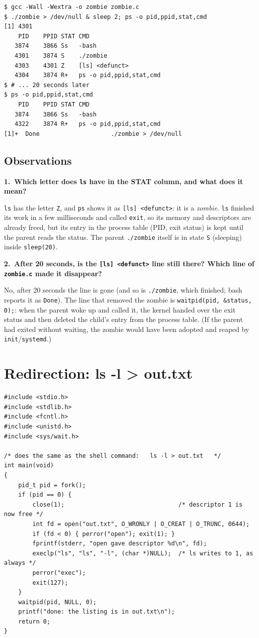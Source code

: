 \documentclass[12pt,a4paper]{article}
\newcommand{\qa}[2]{%
  \par\needspace{5\baselineskip}\medskip
  \noindent\textbf{#1.~#2}\par\smallskip\noindent}
\begin{document}
\begin{lstlisting}[style=terminal,caption={The process table while the parent sleeps, and 20 seconds later}]
$ gcc -Wall -Wextra -o zombie zombie.c
$ ./zombie > /dev/null & sleep 2; ps -o pid,ppid,stat,cmd
[1] 4301
    PID    PPID STAT CMD
   3874    3866 Ss   -bash
   4301    3874 S    ./zombie
   4303    4301 Z    [ls] <defunct>
   4304    3874 R+   ps -o pid,ppid,stat,cmd
$ # ... 20 seconds later
$ ps -o pid,ppid,stat,cmd
    PID    PPID STAT CMD
   3874    3866 Ss   -bash
   4322    3874 R+   ps -o pid,ppid,stat,cmd
[1]+  Done                    ./zombie > /dev/null
\end{lstlisting}

\subsection*{Observations}

\qa{1}{Which letter does \texttt{ls} have in the STAT column, and what does it mean?}
\texttt{ls} has the letter \texttt{Z}, and \texttt{ps} shows it as \texttt{[ls] <defunct>}: it is a \textit{zombie}. \texttt{ls} finished its work in a few milliseconds and called \texttt{exit}, so its memory and descriptors are already freed, but its entry in the process table (PID, exit status) is kept until the parent reads the status. The parent \texttt{./zombie} itself is in state \texttt{S} (sleeping) inside \texttt{sleep(20)}.

\qa{2}{After 20 seconds, is the \texttt{[ls] <defunct>} line still there? Which line of \texttt{zombie.c} made it disappear?}
No, after 20 seconds the line is gone (and so is \texttt{./zombie}, which finished; bash reports it as \texttt{Done}). The line that removed the zombie is \texttt{waitpid(pid, \&status, 0);}: when the parent woke up and called it, the kernel handed over the exit status and then deleted the child's entry from the process table. (If the parent had exited without waiting, the zombie would have been adopted and reaped by \texttt{init}/\texttt{systemd}.)

\newpage
\section{Redirection: ls -l > out.txt}

\begin{lstlisting}[style=code,caption={redirect.c}]
#include <stdio.h>
#include <stdlib.h>
#include <fcntl.h>
#include <unistd.h>
#include <sys/wait.h>

/* does the same as the shell command:   ls -l > out.txt   */
int main(void)
{
    pid_t pid = fork();
    if (pid == 0) {
        close(1);                                /* descriptor 1 is now free */
        int fd = open("out.txt", O_WRONLY | O_CREAT | O_TRUNC, 0644);
        if (fd < 0) { perror("open"); exit(1); }
        fprintf(stderr, "open gave descriptor %d\n", fd);
        execlp("ls", "ls", "-l", (char *)NULL);  /* ls writes to 1, as always */
        perror("exec");
        exit(127);
    }
    waitpid(pid, NULL, 0);
    printf("done: the listing is in out.txt\n");
    return 0;
}
\end{lstlisting}
\end{document}
